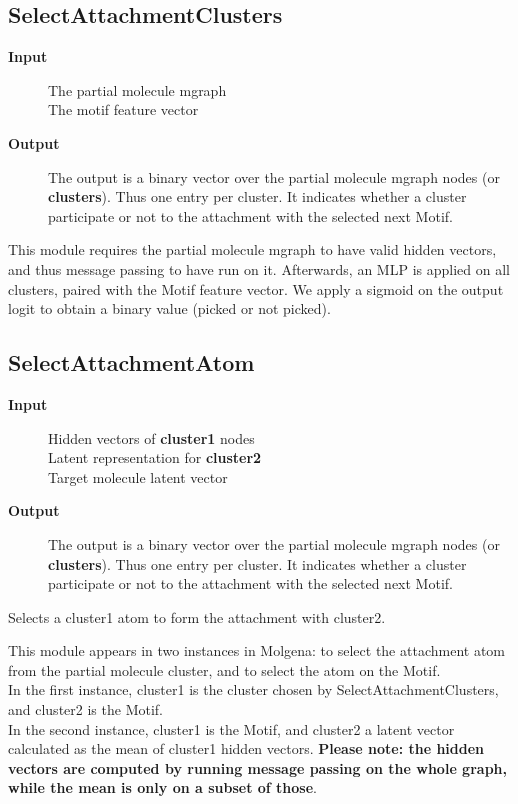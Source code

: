 \documentclass{article}
\begin{document}
\subsection{SelectAttachmentClusters}

\begin{description}
\item[\textbf{Input}]
    The partial molecule mgraph\\
    The motif feature vector
\item[\textbf{Output}]
    The output is a binary vector over the partial molecule mgraph nodes (or \textbf{clusters}).
    Thus one entry per cluster. It indicates whether a cluster participate or not to the attachment with
    the selected next Motif.
\end{description}

This module requires the partial molecule mgraph to have valid hidden vectors, and thus message passing to have run on it.
Afterwards, an MLP is applied on all clusters, paired with the Motif feature vector.
We apply a sigmoid on the output logit to obtain a binary value (picked or not picked).


\subsection{SelectAttachmentAtom}

\begin{description}
\item[\textbf{Input}]
    Hidden vectors of \textbf{cluster1} nodes\\
    Latent representation for \textbf{cluster2}\\
    Target molecule latent vector
\item[\textbf{Output}]
    The output is a binary vector over the partial molecule mgraph nodes (or \textbf{clusters}).
    Thus one entry per cluster. It indicates whether a cluster participate or not to the attachment with
    the selected next Motif.
\end{description}

Selects a cluster1 atom to form the attachment with cluster2.

This module appears in two instances in Molgena: to select the attachment atom from the partial molecule cluster, and to select the atom on the Motif.\\
In the first instance, cluster1 is the cluster chosen by SelectAttachmentClusters, and cluster2 is the Motif.\\
In the second instance, cluster1 is the Motif, and cluster2 a latent vector calculated as the mean of cluster1 hidden vectors.
\textbf{Please note: the hidden vectors are computed by running message passing on the whole graph, while the mean is only on a subset of those}.
\end{document}
